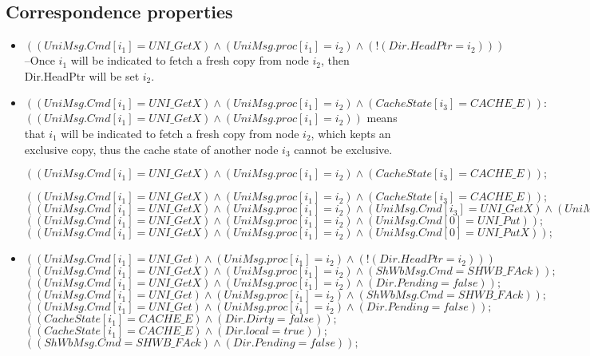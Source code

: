 \documentclass{llncs}
\begin{document}
\subsection{Correspondence properties}
\begin{itemize}
\item $( ( UniMsg.Cmd[i_1]=UNI\_GetX)  \wedge ( UniMsg.proc[i_1]=i_2)  \wedge  (!( Dir.HeadPtr=i_2) )  ) $--Once $i_1$ will be indicated to fetch a fresh copy from node $i_2$, then Dir.HeadPtr will be set $i_2$.
    
\item
$( ( UniMsg.Cmd[i_1]=UNI\_GetX)  \wedge ( UniMsg.proc[i_1]=i_2)  \wedge ( CacheState[i_3]=CACHE\_E)  ) :$
$( ( UniMsg.Cmd[i_1]=UNI\_GetX)  \wedge ( UniMsg.proc[i_1]=i_2)   ) $ means that $i_1$ will be indicated to fetch a fresh copy from node $i_2$, which kepts an exclusive copy, thus the cache state of another node $i_3$ cannot be   exclusive.


$( ( UniMsg.Cmd[i_1]=UNI\_GetX)  \wedge ( UniMsg.proc[i_1]=i_2)  \wedge ( CacheState[i_3]=CACHE\_E)  ) ;$

$( ( UniMsg.Cmd[i_1]=UNI\_GetX)  \wedge ( UniMsg.proc[i_1]=i_2)  \wedge ( CacheState[i_3]=CACHE\_E)  ) ;$
$( ( UniMsg.Cmd[i_1]=UNI\_GetX)  \wedge ( UniMsg.proc[i_1]=i_2)  \wedge ( UniMsg.Cmd[i_3]=UNI\_GetX)  \wedge ( UniMsg.proc[i_3]=i_2)  ) ;$
$( ( UniMsg.Cmd[i_1]=UNI\_GetX)  \wedge ( UniMsg.proc[i_1]=i_2)  \wedge ( UniMsg.Cmd[0]=UNI\_Put)  ) ;$
$( ( UniMsg.Cmd[i_1]=UNI\_GetX)  \wedge ( UniMsg.proc[i_1]=i_2)  \wedge ( UniMsg.Cmd[0]=UNI\_PutX)  ) ;$    
    
\item      
$( ( UniMsg.Cmd[i_1]=UNI\_Get)  \wedge ( UniMsg.proc[i_1]=i_2)  \wedge  (!( Dir.HeadPtr=i_2) )  )$
$( ( UniMsg.Cmd[i_1]=UNI\_GetX)  \wedge ( UniMsg.proc[i_1]=i_2)  \wedge ( ShWbMsg.Cmd=SHWB\_FAck)  ) ;$
$( ( UniMsg.Cmd[i_1]=UNI\_GetX)  \wedge ( UniMsg.proc[i_1]=i_2)  \wedge ( Dir.Pending=false)  ) ;$
$( ( UniMsg.Cmd[i_1]=UNI\_Get)  \wedge ( UniMsg.proc[i_1]=i_2)  \wedge ( ShWbMsg.Cmd=SHWB\_FAck)  ) ;$
$( ( UniMsg.Cmd[i_1]=UNI\_Get)  \wedge ( UniMsg.proc[i_1]=i_2)  \wedge ( Dir.Pending=false)  ) ;$
$( ( CacheState[i_1]=CACHE\_E)  \wedge ( Dir.Dirty=false)  ) ;$
$( ( CacheState[i_1]=CACHE\_E)  \wedge ( Dir.local=true)  ) ;$
$( ( ShWbMsg.Cmd=SHWB\_FAck)  \wedge ( Dir.Pending=false)  ) ;$



\end{itemize}
\end{document}
